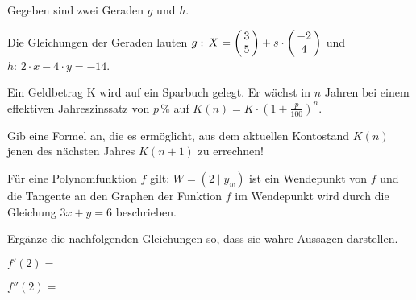 \documentclass[a4paper,12pt]{report}
\begin{document}
\begin{beispiel}[AG 3.4]{1} %

Gegeben sind zwei Geraden $g$ und $h$.

Die Gleichungen der Geraden lauten $g:\, X=\Vek{3}{5}{} + s \cdot \Vek{-2}{4}{}$ und\\
 \mbox{$h:\, 2\cdot x - 4 \cdot y= -14$}.

 
\end{beispiel}

\begin{beispiel}[AG 2.1]{1} %
Ein Geldbetrag K wird auf ein Sparbuch gelegt. Er wächst in $n$ Jahren bei einem effektiven Jahreszinssatz von $p\,\%$ auf $K(n)=K\cdot \left(1+\frac{p}{100}\right)^n$.

\leer

Gib eine Formel an, die es ermöglicht, aus dem aktuellen Kontostand $K(n)$ jenen des nächsten Jahres $K(n+1)$ zu errechnen!	


\end{beispiel}

\begin{beispiel}[AN 3.3]{1} %
Für eine Polynomfunktion $f$ gilt: $W=(2\mid y_w)$ ist ein Wendepunkt von $f$ und die Tangente an den Graphen der Funktion $f$ im Wendepunkt wird durch die Gleichung $3x+y=6$ beschrieben.

Ergänze die nachfolgenden Gleichungen so, dass sie wahre Aussagen darstellen.\leer

$f'(2)=$ \leer

$f''(2)=$ 
\end{beispiel}

\newpage
\pagestyle{fancy}
\setcounter{Antworten}{0}
\end{document}

